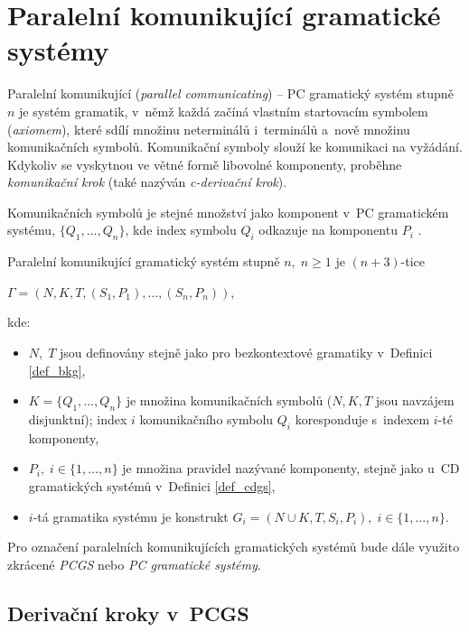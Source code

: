 \section{Paralelní komunikující gramatické systémy}
Paralelní komunikující (\emph{parallel communicating}) -- PC gramatický systém stupně $n$ je systém gramatik, v~němž každá začíná vlastním startovacím symbolem (\emph{axiomem}), které sdílí množinu neterminálů i~terminálů a~nově množinu komunikačních symbolů.
Komunikační symboly slouží ke komunikaci na vyžádání.
Kdykoliv se vyskytnou ve větné formě libovolné komponenty, proběhne \emph{komunikační krok} (také nazýván \emph{c-derivační krok}).

Komunikačních symbolů je stejné množství jako komponent v~PC gramatickém systému, $\{Q_1, \ldots, Q_n\}$, kde index symbolu $Q_i$ odkazuje na komponentu $P_i$ \cite{Handbook-Of-Formal-Languages-2}.
\begin{definition}
    Paralelní komunikující gramatický systém stupně $n,\; n \geq 1$ je $(n+3)$-tice
    \begin{center}
        $\Gamma = (N, K, T, (S_1, P_1), \ldots, (S_n, P_n))$,
    \end{center}
    kde:
    \begin{itemize}
        \item $N,\; T$ jsou definovány stejně jako pro bezkontextové gramatiky v~Definici \ref{def_bkg},
        \item $K = \{Q_1, \ldots, Q_n\}$ je množina komunikačních symbolů ($N, K, T$ jsou navzájem disjunktní); index $i$ komunikačního symbolu $Q_i$ koresponduje s~indexem $i$-té komponenty,
        \item $P_i,\; i \in \{1, \ldots, n\}$ je množina pravidel nazývané komponenty, stejně jako u~CD gramatických systémů v~Definici \ref{def_cdgs},
        \item $i$-tá gramatika systému je konstrukt $G_i = (N \cup K, T, S_i, P_i),\; i \in \{1, \ldots, n\}$.
    \end{itemize}
\end{definition}

\begin{convention}
Pro označení paralelních komunikujících gramatických systémů bude dále využito zkrácené \emph{PCGS} nebo \emph{PC gramatické systémy}.
\end{convention}

\subsection*{Derivační kroky v~PCGS}

